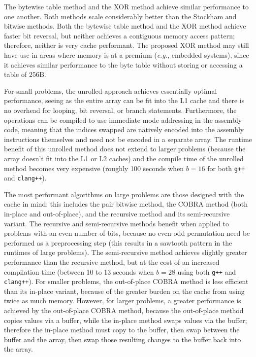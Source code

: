\documentclass[10pt]{article}
\begin{document}
The bytewise table method and the XOR method achieve similar
performance to one another. Both methods scale considerably better
than the Stockham and bitwise methods. Both the bytewise table method
and the XOR method achieve faster bit reversal, but neither achieves a
contiguous memory access pattern; therefore, neither is very cache
performant. The proposed XOR method may still have use in areas where
memory is at a premium (\emph{e.g.}, embedded systems), since it
achieves similar performance to the byte table without storing or
accessing a table of $256$B.

For small problems, the unrolled approach achieves essentially optimal
performance, seeing as the entire array can be fit into the L1 cache
and there is no overhead for looping, bit reversal, or branch
statements. Furthermore, the operations can be compiled to use
immediate mode addressing in the assembly code, meaning that the
indices swapped are natively encoded into the assembly instructions
themselves and need not be encoded in a separate array. The runtime
benefit of this unrolled method does not extend to larger problems
(because the array doesn't fit into the L1 or L2 caches) and the
compile time of the unrolled method becomes very expensive (roughly
100 seconds when $b=16$ for both {\tt g++} and {\tt clang++}).

The most performant algorithms on large problems are those designed
with the cache in mind: this includes the pair bitwise method, the
COBRA method (both in-place and out-of-place), and the recursive
method and its semi-recursive variant. The recursive and
semi-recursive methods benefit when applied to problems with an even
number of bits, because no even-odd permutation need be performed as a
preprocessing step (this results in a sawtooth pattern in the runtimes
of large problems). The semi-recursive method achieves slightly
greater performance than the recursive method, but at the cost of an
increased compilation time (between 10 to 13 seconds when $b=28$ using
both {\tt g++} and {\tt clang++}). For smaller problems, the
out-of-place COBRA method is less efficient than its in-place variant,
because of the greater burden on the cache from using twice as much
memory. However, for larger problems, a greater performance is
achieved by the out-of-place COBRA method, because the out-of-place
method copies values via a buffer, while the in-place method swaps
values via the buffer; therefore the in-place method must copy to the
buffer, then swap between the buffer and the array, then swap those
resulting changes to the buffer back into the array.
\end{document}
